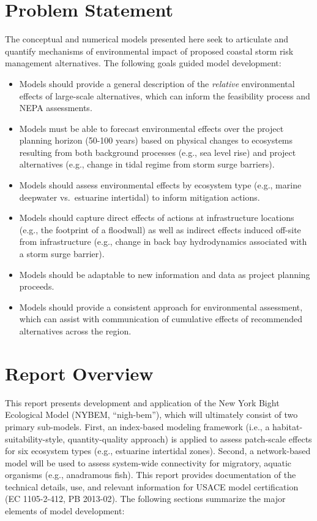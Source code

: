 \documentclass[
]{book}
\begin{document}
\hypertarget{problem-statement}{%
\section*{Problem Statement}\label{problem-statement}}

The conceptual and numerical models presented here seek to articulate and quantify mechanisms of environmental impact of proposed coastal storm risk management alternatives. The following goals guided model development:

\begin{itemize}
\item
  Models should provide a general description of the \emph{relative} environmental effects of large-scale alternatives, which can inform the feasibility process and NEPA assessments.
\item
  Models must be able to forecast environmental effects over the project planning horizon (50-100 years) based on physical changes to ecosystems resulting from both background processes (e.g., sea level rise) and project alternatives (e.g., change in tidal regime from storm surge barriers).
\item
  Models should assess environmental effects by ecosystem type (e.g., marine deepwater vs.~estuarine intertidal) to inform mitigation actions.
\item
  Models should capture direct effects of actions at infrastructure locations (e.g., the footprint of a floodwall) as well as indirect effects induced off-site from infrastructure (e.g., change in back bay hydrodynamics associated with a storm surge barrier).
\item
  Models should be adaptable to new information and data as project planning proceeds.
\item
  Models should provide a consistent approach for environmental assessment, which can assist with communication of cumulative effects of recommended alternatives across the region.
\end{itemize}

\hypertarget{report-overview}{%
\section*{Report Overview}\label{report-overview}}

This report presents development and application of the New York Bight Ecological Model (NYBEM, ``nigh-bem''), which will ultimately consist of two primary sub-models. First, an index-based modeling framework (i.e., a habitat-suitability-style, quantity-quality approach) is applied to assess patch-scale effects for six ecosystem types (e.g., estuarine intertidal zones). Second, a network-based model will be used to assess system-wide connectivity for migratory, aquatic organisms (e.g., anadramous fish). This report provides documentation of the technical details, use, and relevant information for USACE model certification (EC 1105-2-412, PB 2013-02). The following sections summarize the major elements of model development:
\end{document}
